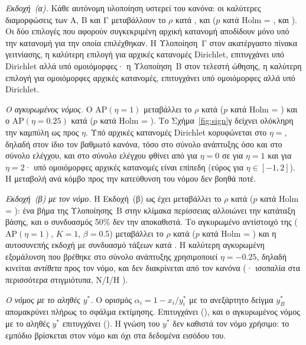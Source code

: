 \documentclass[11pt,a4paper]{article}
\theoremstyle{definition}
\theoremstyle{plain}
\newcommand{\AP}{\mathrm{AP}}
\begin{document}
\emph{Εκδοχή~(α).} Κάθε αυτόνομη υλοποίηση υστερεί του κανόνα: οι καλύτερες διαμορφώσεις των Α, Β και Γ μεταβάλλουν το $\rho$ κατά \TestAbestD, \TestBbestD{} και \TestCbestD{} ($p$ κατά Holm = \TestAbestHolm, \TestBbestHolm{} και \TestCbestHolm). Οι δύο επιλογές που αφορούν συγκεκριμένη αρχική κατανομή αποδίδουν μόνο υπό την κατανομή για την οποία επιλέχθηκαν. Η Υλοποίηση~Γ στον ακατέργαστο πίνακα γειτνίασης, η καλύτερη επιλογή για αρχικές κατανομές Dirichlet, επιτυγχάνει \TestCdirOnDir{} υπό Dirichlet αλλά \TestCdirOnUnif{} υπό ομοιόμορφες· η Υλοποίηση~Β στον τελεστή ώθησης, η καλύτερη επιλογή για ομοιόμορφες αρχικές κατανομές, επιτυγχάνει \TestBunifOnUnif{} υπό ομοιόμορφες αλλά \TestBunifOnDir{} υπό Dirichlet.

\emph{Ο αγκυρωμένος νόμος.} Ο $\AP(\eta=1)$ μεταβάλλει το $\rho$ κατά \TestAPoneD{} \TestAPoneCI{} ($p$ κατά Holm = \TestAPoneHolm) και ο $\AP(\eta=0.25)$ κατά \TestAPquarterD{} ($p$ κατά Holm = \TestAPquarterHolm). Το Σχήμα~\ref{fig:sign}γ δείχνει ολόκληρη την καμπύλη ως προς $\eta$. Υπό αρχικές κατανομές Dirichlet κορυφώνεται στο $\eta={}$\EtaBestDir{}, δηλαδή στον ίδιο τον βαθμωτό κανόνα, τόσο στο σύνολο ανάπτυξης όσο και στο σύνολο ελέγχου, και στο σύνολο ελέγχου φθίνει από \EtaZeroTestDir{} για $\eta=0$ σε \EtaOneTestDir{} για $\eta=1$ και \EtaTwoTestDir{} για $\eta=2$· υπό ομοιόμορφες αρχικές κατανομές είναι επίπεδη (εύρος \EtaUnifRange{} για $\eta\in[-1,2]$). Η μεταβολή ανά κόμβο προς την κατεύθυνση του νόμου δεν βοηθά ποτέ.

\emph{Εκδοχή~(β) με τον νόμο.} Η Εκδοχή~(β) ως έχει μεταβάλλει το $\rho$ κατά \TestPBXnomBD{} ($p$ κατά Holm = \TestPBXnomBHolm): ένα βήμα της Υλοποίησης~Β στην κλίμακα περίσσειας αλλοιώνει την κατάταξη βάσης, και ο συνδυασμός 50\% δεν την αποκαθιστά. Το αγκυρωμένο αντίστοιχό της ($\AP(\eta=1)$, $K=1$, $\beta=0.5$) μεταβάλλει το $\rho$ κατά \TestPBnomD{} ($p$ κατά Holm = \TestPBnomHolm) και η αυτοσυνεπής εκδοχή με συνδυασμό τάξεων κατά \TestPBoneD. Η καλύτερη αγκυρωμένη εξομάλυνση που βρέθηκε στο σύνολο ανάπτυξης χρησιμοποιεί $\eta=-0.25$, δηλαδή κινείται \emph{αντίθετα} προς τον νόμο, και δεν διακρίνεται από τον κανόνα (\TestPBbestDfour· ισοπαλία στα περισσότερα στιγμιότυπα, Ν/Ι/Η \TestPBbestWTL).

\emph{Ο νόμος με το αληθές $y^*$.} Ο ορισμός $\alpha_i=1-x_i/y^*_i$ με το ανεξάρτητο δείγμα $y^*_B$ απομακρύνει πλήρως το σφάλμα εκτίμησης. Επιτυγχάνει \TestTrueProp{} (\TestTruePropD), και ο αγκυρωμένος νόμος με το αληθές $y^*$ επιτυγχάνει \TestTrueAPone{} (\TestTrueAPoneD). Η γνώση του $y^*$ δεν καθιστά τον νόμο χρήσιμο: το εμπόδιο βρίσκεται στον νόμο και όχι στα δεδομένα εισόδου του.
\end{document}
